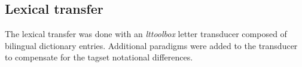 \subsection{Lexical transfer}
The lexical transfer was done with an \emph{lttoolbox} letter
transducer composed of bilingual dictionary entries. Additional
paradigms were added to the transducer to compensate for the tagset
notational differences.
